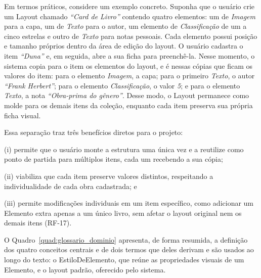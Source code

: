 Em termos práticos, considere um exemplo concreto. Suponha que o usuário crie um Layout chamado \textit{``Card de Livro''} contendo quatro elementos: 
um de \textit{Imagem} para a capa, um de \textit{Texto} para o autor, um elemento de \textit{Classificação} de um a cinco estrelas e
outro de \textit{Texto} para notas pessoais. Cada elemento possui posição e tamanho próprios dentro da área de edição do layout. O usuário cadastra o item \textit{``Duna''} e, em seguida, abre
a sua ficha para preenchê-la. Nesse momento, o sistema copia para o item os elementos do layout, e é nessas cópias que ficam os valores do item:
para o elemento \textit{Imagem}, a capa; para o primeiro \textit{Texto}, o autor \textit{``Frank Herbert''}; para o elemento \textit{Classificação}, o valor \textit{5}; e para o elemento \textit{Texto}, a nota
\textit{``Obra-prima do gênero''}. Desse modo, o Layout permanece como molde para os demais itens da coleção, enquanto cada
 item preserva sua própria ficha visual.

Essa separação traz três benefícios diretos para o projeto: 

(i) permite que o usuário monte a estrutura uma única vez e a reutilize como ponto de partida para múltiplos itens, cada um recebendo a sua cópia;

(ii) viabiliza que cada item preserve valores distintos, respeitando a individualidade de cada obra cadastrada; e 

(iii) permite modificações individuais em um item específico, como adicionar um Elemento extra apenas a um único livro, sem afetar o layout original nem os demais itens (RF-17).

O Quadro~\ref{quad:glossario_dominio} apresenta, de forma resumida, a definição dos quatro conceitos centrais e de dois termos que deles derivam e são usados ao longo do texto: o EstiloDeElemento, que reúne as propriedades visuais de um Elemento, e o layout padrão, oferecido pelo sistema.

